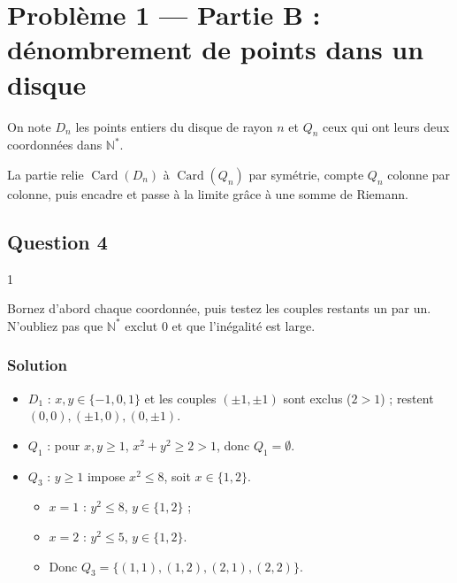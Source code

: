 \documentclass[11pt,a4paper]{article}
\providecommand{\tightlist}{\setlength{\itemsep}{0pt}\setlength{\parskip}{0pt}}
\providecommand{\varnothing}{\emptyset}
\begin{document}
\hypertarget{probluxe8me-1-partie-b-duxe9nombrement-de-points-dans-un-disque}{%
\section{Problème 1 --- Partie B : dénombrement de points dans un disque}\label{probluxe8me-1-partie-b-duxe9nombrement-de-points-dans-un-disque}}

On note \(D_n\) les points entiers du disque de rayon \(n\) et \(Q_n\) ceux qui ont leurs deux coordonnées dans \(\mathbb N^*\).

La partie relie \(\operatorname{Card}(D_n)\) à \(\operatorname{Card}(Q_n)\) par symétrie, compte \(Q_n\) colonne par colonne, puis encadre et passe à la limite grâce à une somme de Riemann.

\hypertarget{question-4}{%
\subsection{Question 4}\label{question-4}}

\begin{indication}{1}

Bornez d'abord chaque coordonnée, puis testez les couples restants un par un. N'oubliez pas que \(\mathbb N^*\) exclut \(0\) et que l'inégalité est large.

\end{indication}

\hypertarget{solution-7}{%
\subsubsection{Solution}\label{solution-7}}

\begin{itemize}
\tightlist
\item
  \(D_1\) : \(x,y\in\{-1,0,1\}\) et les couples \((\pm1,\pm1)\) sont exclus (\(2>1\)) ; restent \((0,0),(\pm1,0),(0,\pm1)\).
\item
  \(Q_1\) : pour \(x,y\geqslant1\), \(x^2+y^2\geqslant2>1\), donc \(Q_1=\varnothing\).
\item
  \(Q_3\) : \(y\geqslant1\) impose \(x^2\leqslant8\), soit \(x\in\{1,2\}\).

  \begin{itemize}
  \tightlist
  \item
    \(x=1\) : \(y^2\leqslant8\), \(y\in\{1,2\}\) ;
  \item
    \(x=2\) : \(y^2\leqslant5\), \(y\in\{1,2\}\).
  \item
    Donc \(Q_3=\{(1,1),(1,2),(2,1),(2,2)\}\).
  \end{itemize}
\end{itemize}
\end{document}
